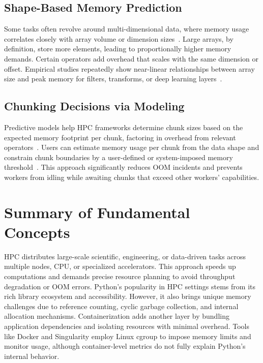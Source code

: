 \subsection{Shape-Based Memory Prediction}
\label{subsec:fundamentals-shape-prediction}

Some tasks often revolve around multi-dimensional data, where memory usage correlates closely with array volume or dimension sizes~\cite{rocklin2015dask,Bader2023}.
Large arrays, by definition, store more elements, leading to proportionally higher memory demands.
Certain operators add overhead that scales with the same dimension or offset.
Empirical studies repeatedly show near-linear relationships between array size and peak memory for filters, transforms, or deep learning layers~\cite{Bader2024}.

\subsection{Chunking Decisions via Modeling}
\label{subsec:fundamentals-chunking-decisions}

Predictive models help \ac{HPC} frameworks determine chunk sizes based on the expected memory footprint per chunk, factoring in overhead from relevant operators~\cite{Bader2023}.
Users can estimate memory usage per chunk from the data shape and constrain chunk boundaries by a user-defined or system-imposed memory threshold~\cite{Bader2024}.
This approach significantly reduces \ac{OOM} incidents and prevents workers from idling while awaiting chunks that exceed other workers' capabilities.


\section{Summary of Fundamental Concepts}
\label{sec:fundamentals-summary}

\ac{HPC} distributes large-scale scientific, engineering, or data-driven tasks across multiple nodes, \ac{CPU}, or specialized accelerators.
This approach speeds up computations and demands precise resource planning to avoid throughput degradation or \ac{OOM} errors.
Python's popularity in \ac{HPC} settings stems from its rich library ecosystem and accessibility. However, it also brings unique memory challenges due to reference counting, cyclic garbage collection, and internal allocation mechanisms.
Containerization adds another layer by bundling application dependencies and isolating resources with minimal overhead.
Tools like Docker and Singularity employ Linux \ac{cgroup} to impose memory limits and monitor usage, although container-level metrics do not fully explain Python's internal behavior.

